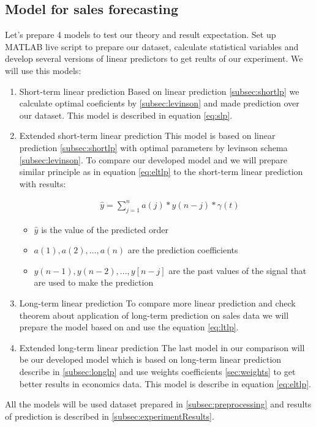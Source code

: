     \subsection{Model for sales forecasting} \label{subsec:calculate_models}
    Let's prepare 4 models to test our theory and result expectation.  Set up MATLAB live script to prepare our dataset, calculate statistical variables and
    develop several versions of linear predictors to get reults of our experiment. We will use this models:
    \begin{enumerate}
        \item Short-term linear prediction 
        Based on linear prediction \ref{subsec:shortlp} we calculate optimal coeficients by \ref{subsec:levinson} and made prediction over our dataset.
        This model is described in equation \ref{eq:slp}.

        \item Extended short-term linear prediction 
        This model is based on linear prediction \ref{subsec:shortlp} with optimal parameters by levinson schema \ref{subsec:levinson}.
        To compare our developed model \label{subsec:extlonglp} and we will prepare similar principle as in equation \ref{eq:eltlp} to the short-term linear
        prediction with results:
        
        \begin{equation} \label{eq:slp}
            \begin{aligned}
                &\hat{y} = \sum_{j=1}^{n} a(j)*y(n-j) * \gamma(t)
            \end{aligned}
        \end{equation}
        \begin{itemize}
            \item $\hat{y}$ is the value of the predicted order
            \item $a(1), a(2), ..., a(n)$ are the prediction coefficients
            \item $y(n-1), y(n-2), ..., y[n-j]$ are the past values of the signal that are used to make the prediction
        \end{itemize}

        \item Long-term linear prediction 
        To compare more linear prediction and check theorem about application of long-term prediction on sales data we will prepare the model
        based on \label{subsec:longlp} and use the equation \ref{eq:ltlp}.

        \item Extended long-term linear prediction
        The last model in our comparison will be our developed model which is based on long-term linear prediction describe in \ref{subsec:longlp} and
        use weights coefficients \ref{sec:weights} to get better results in economics data. This model is describe in equation \ref{eq:eltlp}.
    \end{enumerate}
    All the models will be used dataset prepared in \ref{subsec:preprocessing} and results of prediction is described in \ref{subsec:experimentResults}.
